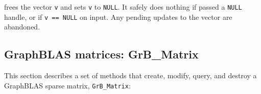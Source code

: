 \documentclass[12pt]{article}
\begin{document}
\noindent
frees the vector \verb'v' and sets \verb'v' to \verb'NULL'.  It safely does
nothing if passed a \verb'NULL' handle, or if \verb'v == NULL' on input.  Any
pending updates to the vector are abandoned.

\newpage
\subsection{GraphBLAS matrices: {\sf GrB\_Matrix}} %
\label{matrix}

This section describes a set of methods that create, modify, query,
and destroy a GraphBLAS sparse matrix, \verb'GrB_Matrix':
\end{document}
